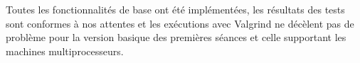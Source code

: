 Toutes les fonctionnalités de base ont été implémentées, les résultats des tests sont conformes à nos attentes et les exécutions avec Valgrind ne décèlent pas de problème pour la version basique des premières séances et celle supportant les machines multiprocesseurs.
